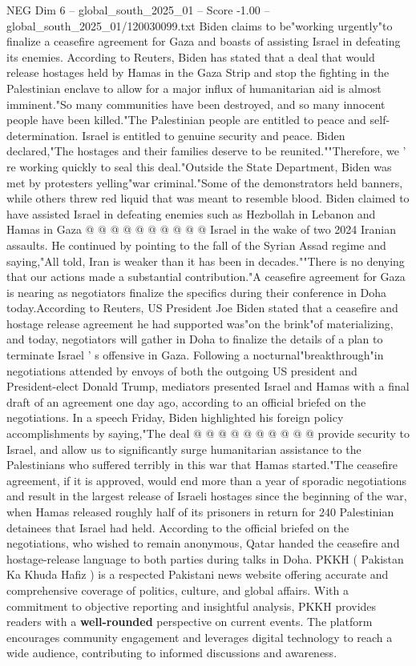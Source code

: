 \begin{textsample}{NEG Dim 6 – global\_south\_2025\_01 – Score -1.00 – global\_south\_2025\_01/120030099.txt}  \label{ex:f6_neg_020}
Biden claims to be"working urgently"to finalize a ceasefire agreement for Gaza and boasts of assisting Israel in defeating its enemies.
According to Reuters, Biden has stated that a deal that would release hostages held by Hamas in the Gaza Strip and stop the fighting in the Palestinian enclave to allow for a major influx of humanitarian aid is almost imminent."So many communities have been destroyed, and so many innocent people have been killed."The Palestinian people are entitled to peace and self-determination.
Israel is entitled to genuine security and peace.
Biden declared,"The hostages and their families deserve to be reunited.""Therefore, we ' re working quickly to seal this deal."Outside the State Department, Biden was met by protesters yelling"war criminal."Some of the demonstrators held banners, while others threw red liquid that was meant to resemble blood.
Biden claimed to have assisted Israel in defeating enemies such as Hezbollah in Lebanon and Hamas in Gaza @ @ @ @ @ @ @ @ @ @ Israel in the wake of two 2024 Iranian assaults.
He continued by pointing to the fall of the Syrian Assad regime and saying,"All told, Iran is weaker than it has been in decades.""There is no denying that our actions made a substantial contribution."A ceasefire agreement for Gaza is nearing as negotiators finalize the specifics during their conference in Doha today.According to Reuters, US President Joe Biden stated that a ceasefire and hostage release agreement he had supported was"on the brink"of materializing, and today, negotiators will gather in Doha to finalize the details of a plan to terminate Israel ' s offensive in Gaza.
Following a nocturnal"breakthrough"in negotiations attended by envoys of both the outgoing US president and President-elect Donald Trump, mediators presented Israel and Hamas with a final draft of an agreement one day ago, according to an official briefed on the negotiations.
In a speech Friday, Biden highlighted his foreign policy accomplishments by saying,"The deal @ @ @ @ @ @ @ @ @ @ provide security to Israel, and allow us to significantly surge humanitarian assistance to the Palestinians who suffered terribly in this war that Hamas started."The ceasefire agreement, if it is approved, would end more than a year of sporadic negotiations and result in the largest release of Israeli hostages since the beginning of the war, when Hamas released roughly half of its prisoners in return for 240 Palestinian detainees that Israel had held.
According to the official briefed on the negotiations, who wished to remain anonymous, Qatar handed the ceasefire and hostage-release language to both parties during talks in Doha.
PKKH ( Pakistan Ka Khuda Hafiz ) is a respected Pakistani news website offering accurate and comprehensive coverage of politics, culture, and global affairs.
With a commitment to objective reporting and insightful analysis, PKKH provides readers with a \textbf{well-rounded} perspective on current events.
The platform encourages community engagement and leverages digital technology to reach a wide audience, contributing to informed discussions and awareness.

\end{textsample}
